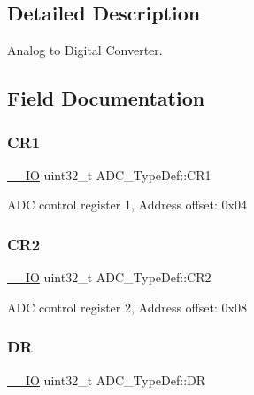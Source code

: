 \subsection{Detailed Description}
Analog to Digital Converter. 

\subsection{Field Documentation}
\mbox{\label{struct_a_d_c___type_def_a89b1ff4376683dd2896ea8b32ded05b2}} 
\subsubsection{\texorpdfstring{C\+R1}{CR1}}
{\footnotesize\ttfamily \hyperlink{core__sc300_8h_aec43007d9998a0a0e01faede4133d6be}{\+\_\+\+\_\+\+IO} uint32\+\_\+t A\+D\+C\+\_\+\+Type\+Def\+::\+C\+R1}

A\+DC control register 1, Address offset\+: 0x04 \mbox{\label{struct_a_d_c___type_def_a1053a65a21af0d27afe1bf9cf7b7aca7}} 
\subsubsection{\texorpdfstring{C\+R2}{CR2}}
{\footnotesize\ttfamily \hyperlink{core__sc300_8h_aec43007d9998a0a0e01faede4133d6be}{\+\_\+\+\_\+\+IO} uint32\+\_\+t A\+D\+C\+\_\+\+Type\+Def\+::\+C\+R2}

A\+DC control register 2, Address offset\+: 0x08 \mbox{\label{struct_a_d_c___type_def_a84114accead82bd11a0e12a429cdfed9}} 
\subsubsection{\texorpdfstring{DR}{DR}}
{\footnotesize\ttfamily \hyperlink{core__sc300_8h_aec43007d9998a0a0e01faede4133d6be}{\+\_\+\+\_\+\+IO} uint32\+\_\+t A\+D\+C\+\_\+\+Type\+Def\+::\+DR}

